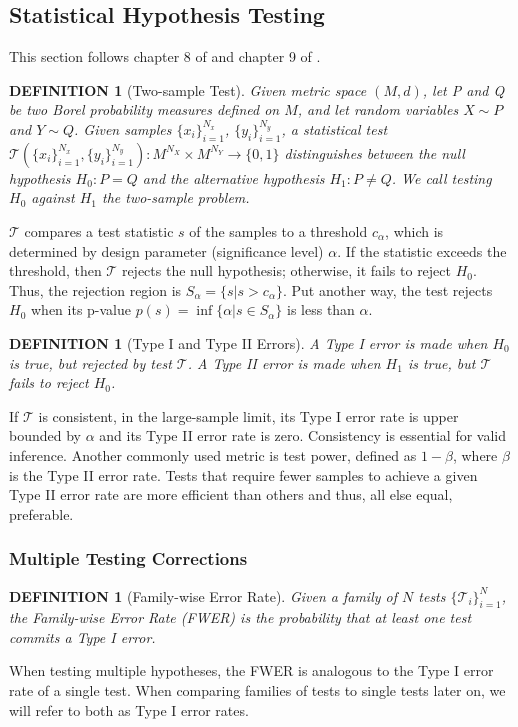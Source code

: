 \documentclass[a4paper,11pt]{article}
\newtheorem{definition}[theorem]{DEFINITION}
\begin{document}
\subsection{Statistical Hypothesis Testing}
This section follows chapter 8 of \cite{casella_statistical_1990} and chapter 9 of \cite{lehmann_testing_2005}. 
\begin{definition}[Two-sample Test]
    Given metric space $(M, d)$, let P and Q be two Borel probability measures defined on $M$, and let random variables $X \sim P$ and $Y \sim Q$. Given samples $\{x_{i}\}_{i=1}^{N_{x}}$, $\{y_{i}\}_{i=1}^{N_{y}}$, a statistical test $\mathcal{T}(\{x_{i}\}_{i=1}^{N_{x}}, \{y_{i}\}_{i=1}^{N_{y}}): M^{N_{X}} \times M^{N_{Y}} \rightarrow \{0, 1\}$ distinguishes between the null hypothesis $H_{0}: P=Q$ and the alternative hypothesis $H_{1}: P \neq Q$. We call testing $H_{0}$ against $H_{1}$ the two-sample problem.
\end{definition}
$\mathcal{T}$ compares a test statistic $s$ of the samples to a threshold $c_{\alpha}$, which is determined by design parameter (significance level) $\alpha$. If the statistic exceeds the threshold, then $\mathcal{T}$ rejects the null hypothesis; otherwise, it fails to reject $H_{0}$. Thus, the rejection region is $S_{\alpha} = \{s | s > c_{\alpha}\}$. Put another way, the test rejects $H_{0}$ when its p-value $p(s)=\inf \{\alpha | s \in S_{\alpha}\}$ is less than $\alpha$.

\begin{definition}[Type I and Type II Errors]
    A Type I error is made when $H_{0}$ is true, but rejected by test $\mathcal{T}$. A Type II error is made when $H_{1}$ is true, but $\mathcal{T}$ fails to reject $H_{0}$.
\end{definition}
If $\mathcal{T}$ is consistent, in the large-sample limit, its Type I error rate is upper bounded by $\alpha$ and its Type II error rate is zero. Consistency is essential for valid inference. Another commonly used metric is test power, defined as $1-\beta$, where $\beta$ is the Type II error rate. Tests that require fewer samples to achieve a given Type II error rate are more efficient than others and thus, all else equal, preferable.

\subsubsection{Multiple Testing Corrections}
\begin{definition}[Family-wise Error Rate]
    Given a family of $N$ tests $\{\mathcal{T}_{i}\}_{i=1}^{N}$, the Family-wise Error Rate (FWER) is the probability that at least one test commits a Type I error.
\end{definition}
When testing multiple hypotheses, the FWER is analogous to the Type I error rate of a single test. When comparing families of tests to single tests later on, we will refer to both as Type I error rates. 
\end{document}
